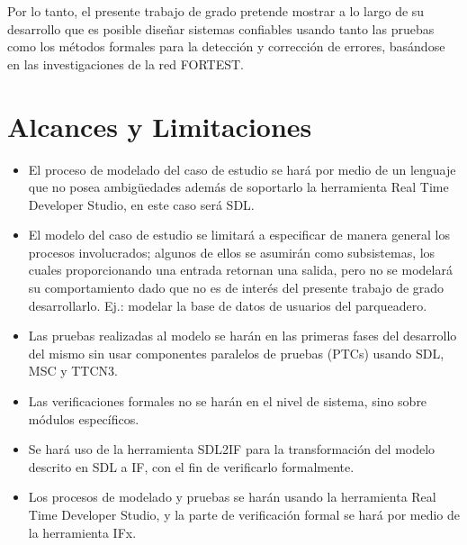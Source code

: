 Por lo tanto, el presente trabajo de grado pretende mostrar a lo largo de su 
desarrollo que es posible dise\~nar sistemas confiables usando tanto las pruebas 
como los m\'etodos formales para la detecci\'on y correcci\'on de errores, 
bas\'andose en las investigaciones de la red FORTEST.

\section{Alcances y Limitaciones}

\begin{itemize}
 \item El proceso de modelado del caso de estudio se har\'a por medio 
de un lenguaje que no posea ambig\"uedades adem\'as de soportarlo la herramienta 
Real Time Developer Studio, en este caso ser\'a SDL.
\item El modelo del caso de estudio se limitar\'a a especificar de manera 
general los procesos involucrados; algunos de ellos se asumir\'an como 
subsistemas, los cuales proporcionando una entrada retornan una salida, pero no 
se modelar\'a su comportamiento dado que no es de inter\'es del presente trabajo 
de grado desarrollarlo. Ej.: modelar la base de datos de usuarios del 
parqueadero. 
\item Las pruebas realizadas al modelo se har\'an en las primeras fases del 
desarrollo del mismo sin usar componentes paralelos de pruebas (PTCs) usando SDL, MSC y TTCN3.
\item Las verificaciones formales no se har\'an en el nivel de sistema, sino 
sobre m\'odulos espec\'ificos.
\item Se har\'a uso de la herramienta SDL2IF para la transformaci\'on del 
modelo descrito en SDL a IF, con el fin de verificarlo formalmente.
\item Los procesos de modelado y pruebas se har\'an usando la herramienta Real 
Time Developer Studio, y la parte de verificaci\'on formal se har\'a por medio 
de la herramienta IFx.
\end{itemize}

